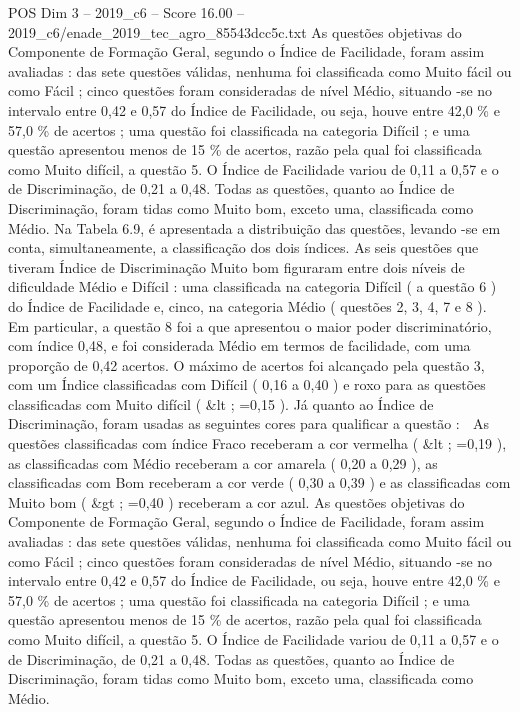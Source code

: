 \begin{textsample}{POS Dim 3 – 2019\_c6 – Score 16.00 – 2019\_c6/enade\_2019\_tec\_agro\_85543dcc5c.txt}
As questões objetivas do Componente de Formação Geral, segundo o Índice de Facilidade, foram assim avaliadas : das sete questões válidas, nenhuma foi classificada como Muito fácil ou como Fácil ; cinco questões foram consideradas de nível Médio, situando -se no intervalo entre 0,42 e 0,57 do Índice de Facilidade, ou seja, houve entre 42,0 \% e 57,0 \% de acertos ; uma questão foi classificada na categoria Difícil ; e uma questão apresentou menos de 15 \% de acertos, razão pela qual foi classificada como Muito difícil, a questão 5.
O Índice de Facilidade variou de 0,11 a 0,57 e o de Discriminação, de 0,21 a 0,48.
Todas as questões, quanto ao Índice de Discriminação, foram tidas como Muito bom, exceto uma, classificada como Médio.
Na Tabela 6.9, é apresentada a distribuição das questões, levando -se em conta, simultaneamente, a classificação dos dois índices.
As seis questões que tiveram Índice de Discriminação Muito bom figuraram entre dois níveis de dificuldade Médio e Difícil : uma classificada na categoria Difícil ( a questão 6 ) do Índice de Facilidade e, cinco, na categoria Médio ( questões 2, 3, 4, 7 e 8 ).
Em particular, a questão 8 foi a que apresentou o maior poder discriminatório, com índice 0,48, e foi considerada Médio em termos de facilidade, com uma proporção de 0,42 acertos.
O máximo de acertos foi alcançado pela questão 3, com um Índice classificadas com Difícil ( 0,16 a 0,40 ) e roxo para as questões classificadas com Muito difícil ( \&lt ; =0,15 ).
Já quanto ao Índice de Discriminação, foram usadas as seguintes cores para qualificar a questão :  As questões classificadas com índice Fraco receberam a cor vermelha ( \&lt ; =0,19 ), as classificadas com Médio receberam a cor amarela ( 0,20 a 0,29 ), as classificadas com Bom receberam a cor verde ( 0,30 a 0,39 ) e as classificadas com Muito bom ( \&gt ; =0,40 ) receberam a cor azul.
As questões objetivas do Componente de Formação Geral, segundo o Índice de Facilidade, foram assim avaliadas : das sete questões válidas, nenhuma foi classificada como Muito fácil ou como Fácil ; cinco questões foram consideradas de nível Médio, situando -se no intervalo entre 0,42 e 0,57 do Índice de Facilidade, ou seja, houve entre 42,0 \% e 57,0 \% de acertos ; uma questão foi classificada na categoria Difícil ; e uma questão apresentou menos de 15 \% de acertos, razão pela qual foi classificada como Muito difícil, a questão 5.
O Índice de Facilidade variou de 0,11 a 0,57 e o de Discriminação, de 0,21 a 0,48.
Todas as questões, quanto ao Índice de Discriminação, foram tidas como Muito bom, exceto uma, classificada como Médio.

\end{textsample}
